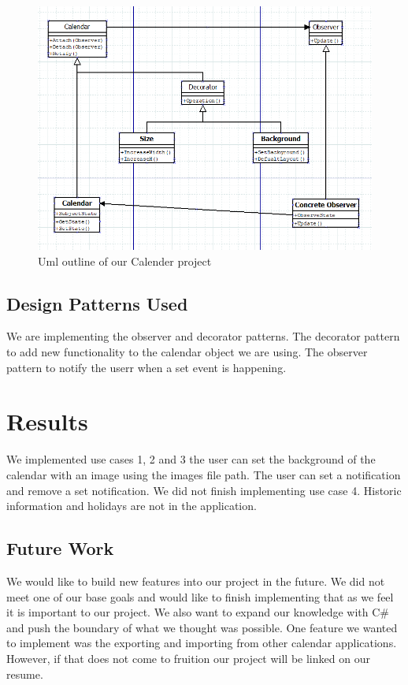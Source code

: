 \documentclass[10pt,conference,onecolumn,compsoc]{IEEEtran}
\begin{document}
\begin{figure}[ht!]
\includegraphics[scale=1]{Uml Format.png}
\caption{Uml outline of our Calender project}
\label{UML of Calender Project}
\end{figure}


\subsection{Design Patterns Used}
We are implementing the observer and decorator patterns. The decorator pattern to add new functionality to the calendar object we are using. The observer pattern to notify the userr when a set event is happening.


\section{Results}
We implemented use cases 1, 2 and 3 the user can set the background of the calendar with an image using the images file path. The user can set a notification and remove a set notification. We did not finish implementing use case 4. Historic information and holidays are not in the application.


\subsection{Future Work}
We would like to build new features into our project in the future. We did not meet one of our base goals and would like to finish implementing that as we feel it is important to our project. We also want to expand our knowledge with C\# and push the boundary of what we thought was possible. One feature we wanted to implement was the exporting and importing from other calendar applications. However, if that does not come to fruition our project will be linked on our resume.
\end{document}
